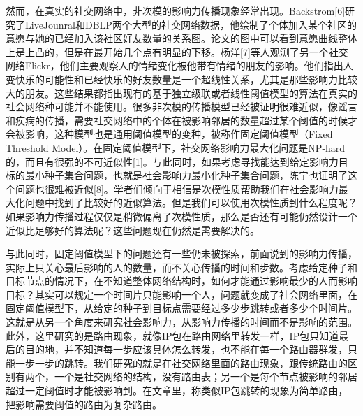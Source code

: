 然而，在真实的社交网络中，非次模的影响力传播现象经常出现。Backstrom[6]研究了LiveJounral和DBLP两个大型的社交网络数据，他绘制了个体加入某个社区的意愿与她的已经加入该社区好友数量的关系图。论文的图中可以看到意愿曲线整体上是上凸的，但是在最开始几个点有明显的下移。杨洋[7]等人观测了另一个社交网络Flickr，他们主要观察人的情绪变化被他带有情绪的朋友的影响。他们指出人变快乐的可能性和已经快乐的好友数量是一个超线性关系，尤其是那些影响力比较大的朋友。这些结果都指出现有的基于独立级联或者线性阈值模型的算法在真实的社会网络种可能并不能使用。很多非次模的传播模型已经被证明很难近似，像谣言和疾病的传播，需要社交网络中的个体在被影响邻居的数量超过某个阈值的时候才会被影响，这种模型也是通用阈值模型的变种，被称作固定阈值模型（Fixed Threshold Model）。在固定阈值模型下，社交网络影响力最大化问题是NP-hard的，而且有很强的不可近似性[1]。与此同时，如果考虑寻找能达到给定影响力目标的最小种子集合问题，也就是社会影响力最小化种子集合问题，陈宁也证明了这个问题也很难被近似[8]。学者们倾向于相信是次模性质帮助我们在社会影响力最大化问题中找到了比较好的近似算法。但是我们可以使用次模性质到什么程度呢？如果影响力传播过程仅仅是稍微偏离了次模性质，那么是否还有可能仍然设计一个近似比足够好的算法呢？这些问题现在仍然是需要解决的。

与此同时，固定阈值模型下的问题还有一些仍未被探索，前面说到的影响力传播，实际上只关心最后影响的人的数量，而不关心传播的时间和步数。考虑给定种子和目标节点的情况下，在不知道整体网络结构时，如何才能通过影响最少的人而影响目标？其实可以规定一个时间片只能影响一个人，问题就变成了社会网络里面，在固定阈值模型下，从给定的种子到目标点需要经过多少步跳转或者多少个时间片。这就是从另一个角度来研究社会影响力，从影响力传播的时间而不是影响的范围。此外，这里研究的是路由现象，就像IP包在路由网络里转发一样，IP包只知道最后的目的地，并不知道每一步应该具体怎么转发，也不能在每一个路由器群发，只能一步一步的跳转。我们研究的就是在社交网络里面的路由现象，跟传统路由的区别有两个，一个是社交网络的结构，没有路由表；另一个是每个节点被影响的邻居超过一定阈值时才能被影响到。在文章里，称类似IP包跳转的现象为简单路由，把影响需要阈值的路由为复杂路由。

